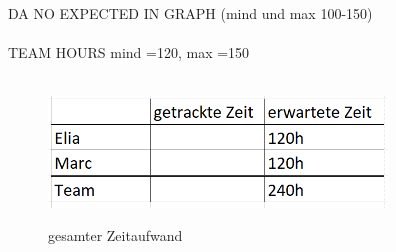 DA NO EXPECTED IN GRAPH (mind und max 100-150)\\
\\
TEAM HOURS mind =120, max =150\\
\\

\begin{figure}[H]
    \centering
    \includegraphics[width=9cm]{resources/tracket_time_temp.png}\\
    \caption{gesamter Zeitaufwand}
\end{figure}




